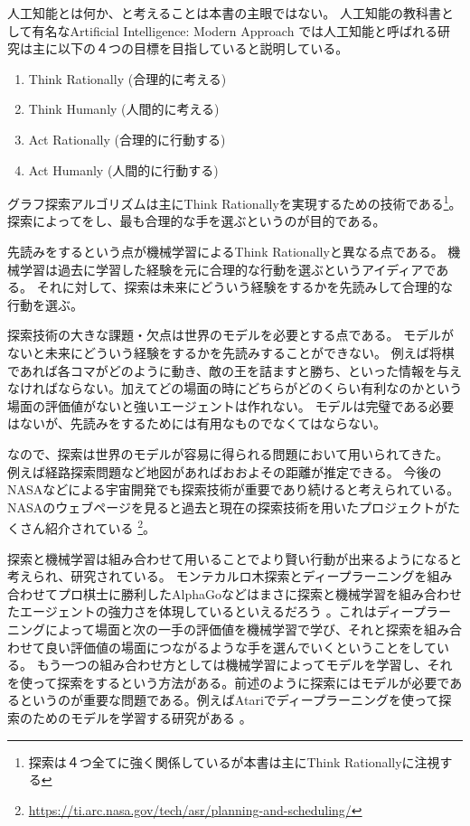 人工知能とは何か、と考えることは本書の主眼ではない。
人工知能の教科書として有名なArtificial Intelligence: Modern Approach \cite{russelln03}では人工知能と呼ばれる研究は主に以下の４つの目標を目指していると説明している。

\begin{enumerate}
\item Think Rationally (合理的に考える)
\item Think Humanly (人間的に考える)
\item Act Rationally (合理的に行動する)
\item Act Humanly (人間的に行動する)
\end{enumerate}

グラフ探索アルゴリズムは主にThink Rationallyを実現するための技術である\footnote{探索は４つ全てに強く関係しているが本書は主にThink Rationallyに注視する}。
探索によってをし、最も合理的な手を選ぶというのが目的である。

先読みをするという点が機械学習によるThink Rationallyと異なる点である。
機械学習は過去に学習した経験を元に合理的な行動を選ぶというアイディアである。
それに対して、探索は未来にどういう経験をするかを先読みして合理的な行動を選ぶ。


探索技術の大きな課題・欠点は世界のモデルを必要とする点である。
モデルがないと未来にどういう経験をするかを先読みすることができない。
例えば将棋であれば各コマがどのように動き、敵の王を詰ますと勝ち、といった情報を与えなければならない。加えてどの場面の時にどちらがどのくらい有利なのかという場面の評価値がないと強いエージェントは作れない。
モデルは完璧である必要はないが、先読みをするためには有用なものでなくてはならない。

なので、探索は世界のモデルが容易に得られる問題において用いられてきた。
例えば経路探索問題など地図があればおおよその距離が推定できる。
今後のNASAなどによる宇宙開発でも探索技術が重要であり続けると考えられている。NASAのウェブページを見ると過去と現在の探索技術を用いたプロジェクトがたくさん紹介されている \footnote{\url{https://ti.arc.nasa.gov/tech/asr/planning-and-scheduling/}}。


探索と機械学習は組み合わせて用いることでより賢い行動が出来るようになると考えられ、研究されている。
モンテカルロ木探索とディープラーニングを組み合わせてプロ棋士に勝利したAlphaGoなどはまさに探索と機械学習を組み合わせたエージェントの強力さを体現しているといえるだろう \cite{silver2016mastering}。これはディープラーニングによって場面と次の一手の評価値を機械学習で学び、それと探索を組み合わせて良い評価値の場面につながるような手を選んでいくということをしている。
もう一つの組み合わせ方としては機械学習によってモデルを学習し、それを使って探索をするという方法がある。前述のように探索にはモデルが必要であるというのが重要な問題である。例えばAtariでディープラーニングを使って探索のためのモデルを学習する研究がある \cite{oh2015action,silver2016predictron,chiappa2017recurrent}。

